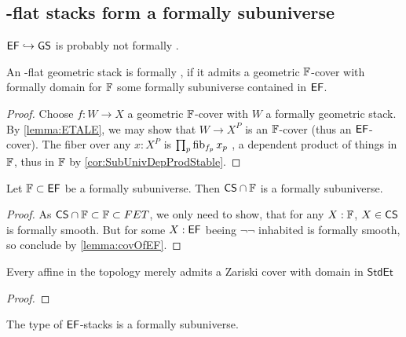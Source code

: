 \subsection{\etale-flat stacks form a formally \etale subuniverse}

%


\begin{warning}
	$\mathsf{EF} \hookrightarrow \mathsf{GS}$ is probably not formally \etale.
\end{warning}
\begin{lemma}{\label{lemma:FetFromFCover}}
	An \etale-flat geometric stack is formally \etale , if it admits a geometric $\mathbb{F}$-cover with formally \etale domain for $\mathbb{F}$ some formally \etale subuniverse contained in $\mathsf{EF}$.
\end{lemma}
\begin{proof}
	Choose $f: W \to X$ a geometric $\mathbb{F}$-cover with $W$ a formally \etale geometric stack. By \ref{lemma:ETALE}, we may show that $W \to X^P$ is an $\mathbb{F}$-cover (thus an $\mathsf{EF}$-cover). The fiber over any $x :X^P$ is $\prod_p \operatorname{fib}_{f_p} x_p$ , a dependent product of things in $\mathbb{F}$, thus in $\mathbb{F}$ by \ref{cor:SubUnivDepProdStable}. 
\end{proof}
\begin{lemma}{\label{lemma:CSSubUniv}}
	Let $\mathbb{F} \subset \mathsf{EF}$ be a formally \etale subuniverse. Then $\mathsf{CS} \cap \mathbb{F}$ is a formally \etale subuniverse.
\end{lemma}
\begin{proof}
	As $\mathsf{CS} \cap \mathbb{F} \subset \mathbb{F} \subset FET$, we only need to show, that for any $ X: \mathbb{F}$, $X \in \mathsf{CS}$ is formally smooth. But for some $X : \mathsf{EF}$ beeing $\lnot \lnot$ inhabited is formally smooth, so conclude by \ref{lemma:covOfEF}.
\end{proof}
\begin{lemma}{\label{lemma:ZarStdEtCover}}
	Every affine in the \etale topology merely admits a Zariski cover with domain in $\mathsf{StdEt}$
\end{lemma}
\begin{proof}
	 \todocite
\end{proof}
\begin{theorem}
	The type of $\mathsf{EF}$-stacks is a formally \etale subuniverse.
\end{theorem}
